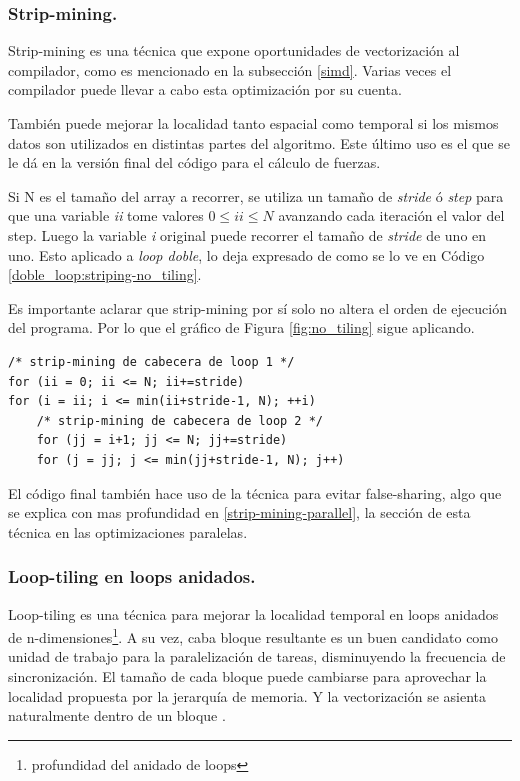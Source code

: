 \documentclass{article}
\begin{document}
\subsubsection{Strip-mining.\label{strip-mining}}
Strip-mining es una técnica que expone oportunidades de vectorización al compilador, como es mencionado
en la subsección \ref{simd}. Varias veces el compilador puede llevar a cabo esta optimización por su cuenta.


También puede mejorar la localidad tanto espacial como temporal si los mismos datos son utilizados en distintas partes
del algoritmo. Este último uso es el que se le dá en la versión final del código para el cálculo de fuerzas.


Si N es el tamaño del array a recorrer, se utiliza un tamaño de \textit{stride} ó \textit{step} para que una variable \textit{ii}
tome valores $0\leq{ii}\leq N$ avanzando cada iteración el valor del step. Luego la variable \textit{i} original puede recorrer
el tamaño de \textit{stride} de uno en uno. Esto aplicado a \textit{loop doble}, lo deja expresado de como se lo ve en
Código \ref{doble_loop:striping-no_tiling}.

Es importante aclarar que strip-mining por sí solo no altera el orden de ejecución del programa. Por lo
que el gráfico de Figura \ref{fig:no_tiling} sigue aplicando.

\begin{lstlisting}[style=CStyle,label=doble_loop:striping-no_tiling,caption=doble loop con strip-mining en ambos loops.]
/* strip-mining de cabecera de loop 1 */
for (ii = 0; ii <= N; ii+=stride)
for (i = ii; i <= min(ii+stride-1, N); ++i)
	/* strip-mining de cabecera de loop 2 */
	for (jj = i+1; jj <= N; jj+=stride)
	for (j = jj; j <= min(jj+stride-1, N); j++)
\end{lstlisting}


El código final también hace uso de la técnica para evitar false-sharing, algo que se explica con mas profundidad
en \ref{strip-mining-parallel}, la sección de esta técnica en las optimizaciones paralelas.

\subsubsection{Loop-tiling en loops anidados.\label{loop-tiling}}

Loop-tiling es una técnica para mejorar la localidad temporal en loops anidados de
n-dimensiones\footnote{profundidad del anidado de loops}. A su vez, caba bloque resultante
es un buen candidato como unidad de trabajo para la paralelización de tareas, disminuyendo
la frecuencia de sincronización. El tamaño de cada bloque puede
cambiarse para aprovechar la localidad propuesta por la jerarquía de memoria. Y la vectorización
se asienta naturalmente dentro de un bloque \cite{Wolfe89moreiteration}.
\end{document}
